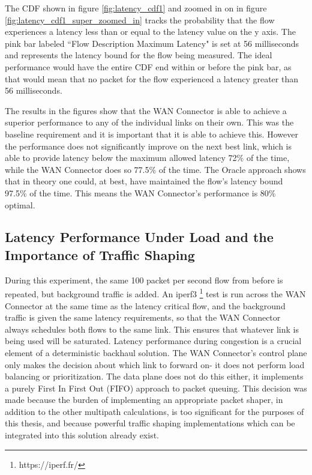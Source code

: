 The CDF shown in figure \ref{fig:latency_cdf1} and zoomed in on in figure \ref{fig:latency_cdf1_super_zoomed_in} tracks the probability that the flow experiences a latency less than or equal to the latency value on the y axis. The pink bar labeled “Flow Description Maximum Latency" is set at 56 milliseconds and represents the latency bound for the flow being measured. The ideal performance would have the entire CDF end within or before the pink bar, as that would mean that no packet for the flow experienced a latency greater than 56 milliseconds.


The results in the figures show that the WAN Connector is able to achieve a superior performance to any of the individual links on their own. This was the baseline requirement and it is important that it is able to achieve this. However the performance does not significantly improve on the next best link, which is able to provide latency below the maximum allowed latency 72\% of the time, while the WAN Connector does so 77.5\% of the time. The Oracle approach shows that in theory one could, at best, have maintained the flow's latency bound 97.5\% of the time. This means the WAN Connector's performance is 80\% optimal.


\subsection{Latency Performance Under Load and the Importance of Traffic Shaping}

During this experiment, the same 100 packet per second flow from before is repeated, but background traffic is added. An iperf3 \footnote{https://iperf.fr/} test is run across the WAN Connector at the same time as the latency critical flow, and the background traffic is given the same latency requirements, so that the WAN Connector always schedules both flows to the same link. This ensures that whatever link is being used will be saturated. Latency performance during congestion is a crucial element of a deterministic backhaul solution. The WAN Connector's control plane only makes the decision about which link to forward on- it does not perform load balancing or prioritization. The data plane does not do this either, it implements a purely First In First Out (FIFO) approach to packet queuing. This decision was made because the burden of implementing an appropriate packet shaper, in addition to the other multipath calculations, is too significant for the purposes of this thesis, and because powerful traffic shaping implementations which can be integrated into this solution already exist.

